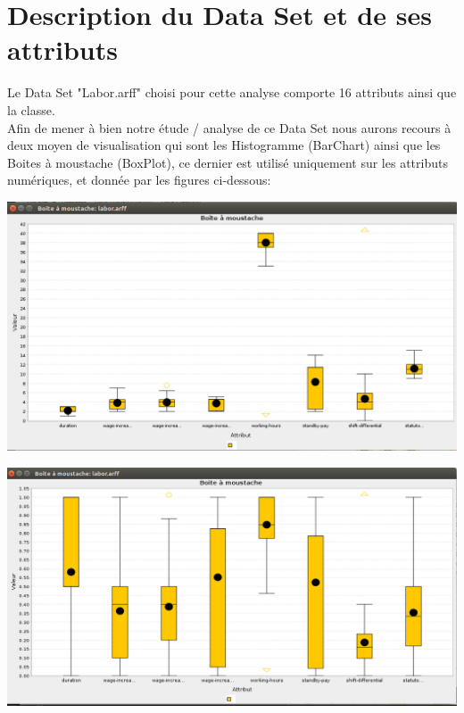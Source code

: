 \documentclass[12pt,a4paper,oneside]{book}
\begin{document}
\section{Description du Data Set et de ses attributs}
Le Data Set "Labor.arff" choisi pour cette analyse comporte 16 attributs ainsi que la classe.\\
Afin de mener à bien notre étude / analyse de ce Data Set nous aurons recours à deux moyen de visualisation qui sont les Histogramme (BarChart) ainsi que les Boites à moustache (BoxPlot), ce dernier est utilisé uniquement sur les attributs numériques, et donnée par les figures ci-dessous:
\begin{center}
	\includegraphics[width=1\textwidth]{screens/BoxPlot.png}%
	\label{labelname}%
\end{center}

\begin{center}
	\includegraphics[width=1\textwidth]{screens/BoxPlotN.png}%
	\label{labelname}%
\end{center}
\end{document}
